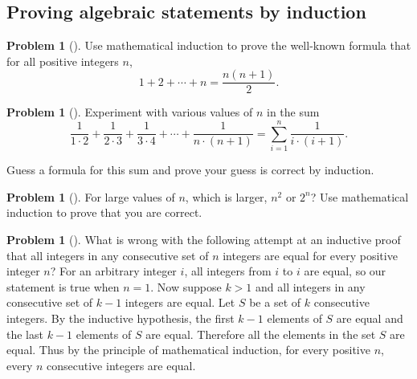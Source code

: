 \documentclass[10pt,]{book}
\theoremstyle{plain}
\theoremstyle{definition}
\newtheorem{activity}[project]{Problem}
\theoremstyle{definition}
\numberwithin{equation}{chapter}
\begin{document}
\subsection[{Proving algebraic statements by induction}]{Proving algebraic statements by induction}\label{subsection-75}
\begin{activity}[]\marginsymbol[-1em]{} \label{activity-363}
Use mathematical induction to prove the well-known formula that for all positive integers \(n\),%
\begin{equation*}
1+2 + \cdots +n = \frac{n(n+1)}{2}.
\end{equation*}
%
\end{activity}
\begin{activity}[]\marginsymbol[-1em]{} \label{activity-364}
Experiment with various values of \(n\) in the sum%
\begin{equation*}
\frac{1}{1\cdot2}+\frac{1}{2\cdot3} + \frac{1}{3\cdot
4}+\cdots+\frac{1}{n\cdot (n+1)} = \sum_{i=1}^n \frac{1}{i\cdot(i+1)}.
\end{equation*}
%
\par
Guess a formula for this sum and prove your guess is correct by induction.%
\end{activity}
\begin{activity}[]\marginsymbol[-1em]{} \label{activity-365}
For large values of \(n\), which is larger, \(n^2\) or \(2^n\)? Use mathematical induction to prove that you are correct.%
\end{activity}
\begin{activity}[]\marginsymbol[-1em]{} \label{activity-366}
What is wrong with the following attempt at an inductive proof that all integers in any consecutive set of \(n\) integers are equal for every positive integer \(n\)? For an arbitrary integer \(i\), all integers from \(i\) to \(i\) are equal, so our statement is true when \(n=1\). Now suppose \(k>1\) and all integers in any consecutive set of \(k-1\) integers are equal. Let \(S\) be a set of \(k\) consecutive integers. By the inductive hypothesis, the first \(k-1\) elements of \(S\) are equal and the last \(k-1\) elements of \(S\) are equal. Therefore all the elements in the set \(S\) are equal. Thus by the principle of mathematical induction, for every positive \(n\), every \(n\) consecutive integers are equal.%
\end{activity}
\typeout{************************************************}
\typeout{************************************************}
\end{document}
